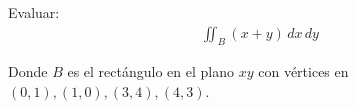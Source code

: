 Evaluar: 
    \begin{align*}
        \iint_B (x+y) \, dx \, dy
    \end{align*}
    
Donde $B$ es el rectángulo en el plano $xy$ con vértices en $(0,1),(1,0),(3,4),(4,3)$.
